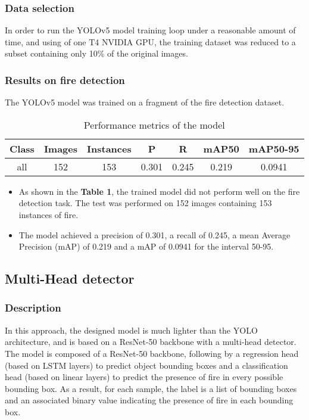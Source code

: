 \documentclass{article}
\begin{document}
\subsubsection{Data selection}

In order to run the YOLOv5 model training loop under a reasonable amount of time, and using of one T4 NVIDIA GPU, the training dataset was reduced to a subset containing only 10\% of the original images.

\subsubsection{Results on fire detection}

The YOLOv5 model was trained on a fragment of the fire detection dataset.

\begin{table}[ht]
    \centering
    \begin{tabular}{|c|c|c|c|c|c|c|}
    \hline
    Class & Images & Instances & P & R & mAP50 & mAP50-95 \\ 
    \hline
    all & 152 & 153 & 0.301 & 0.245 & 0.219 & 0.0941 \\ 
    \hline
    \end{tabular}
    \caption{Performance metrics of the model}
    \label{table:first_table}
\end{table}

\begin{itemize}
    \item As shown in the \textbf{Table 1}, the trained model did not perform well on the fire detection task. The test was performed on 152 images containing 153 instances of fire.
    \item The model achieved a precision of 0.301, a recall of 0.245, a mean Average Precision (mAP) of 0.219 and a mAP of 0.0941 for the interval 50-95.
\end{itemize}

\newpage

\subsection{Multi-Head detector}

\subsubsection{Description}

In this approach, the designed model is much lighter than the YOLO architecture, and is based on a ResNet-50 backbone with a multi-head detector.
The model is composed of a ResNet-50 backbone, following by a regression head (based on LSTM layers) to predict object bounding boxes and a classification head (based on linear layers) to predict the presence of fire in every possible bounding box.
As a result, for each sample, the label is a list of bounding boxes and an associated binary value indicating the presence of fire in each bounding box.
\end{document}
